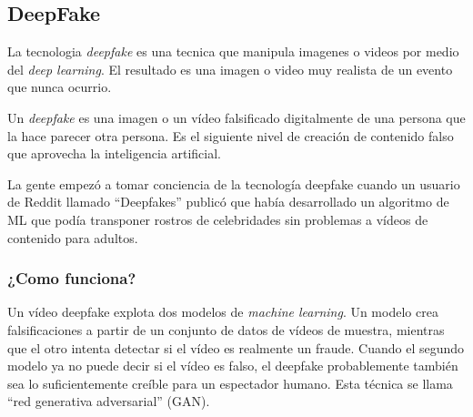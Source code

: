 \documentclass[runningheads]{llncs} %
\begin{document}
\subsection{DeepFake}
La tecnologia \textit{deepfake} es una tecnica que manipula imagenes o videos por medio del 
\textit{deep learning}. El resultado es una imagen o video muy realista de un evento que nunca ocurrio.
\cite{ej-deepfake2}

Un \textit{deepfake} es una imagen o un vídeo falsificado digitalmente de una persona 
que la hace parecer otra persona. Es el siguiente nivel de creación de contenido falso 
que aprovecha la inteligencia artificial. \cite{ej-deepfake2}

La gente empezó a tomar conciencia de la tecnología deepfake cuando un usuario de Reddit 
llamado \textquotedblleft{}Deepfakes\textquotedblright{} publicó que había desarrollado
un algoritmo de ML que podía transponer rostros de celebridades sin problemas
a vídeos de contenido para adultos. \cite{ej-deepfake2}
 
\subsubsection{¿Como funciona?}
Un vídeo deepfake explota dos modelos de \textit{machine learning}. 
Un modelo crea falsificaciones a partir de un conjunto de datos de vídeos de muestra, 
mientras que el otro intenta detectar si el vídeo es realmente un fraude. 
Cuando el segundo modelo ya no puede decir si el vídeo es falso, 
el deepfake probablemente también sea lo suficientemente creíble para un 
espectador humano. 
Esta técnica se llama
\textquotedblleft{}red generativa adversarial\textquotedblright{} (GAN). \cite{ej-deepfake2}
\end{document}
